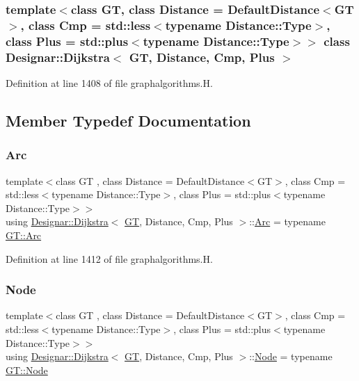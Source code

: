 \subsubsection*{template$<$class GT, class Distance = Default\+Distance$<$\+G\+T$>$, class Cmp = std\+::less$<$typename Distance\+::\+Type$>$, class Plus = std\+::plus$<$typename Distance\+::\+Type$>$$>$\newline
class Designar\+::\+Dijkstra$<$ G\+T, Distance, Cmp, Plus $>$}



Definition at line 1408 of file graphalgorithms.\+H.



\subsection{Member Typedef Documentation}
\mbox{\label{class_designar_1_1_dijkstra_a5f0682f4edfd1456b7d4432fa976c641}} 
\subsubsection{\texorpdfstring{Arc}{Arc}}
{\footnotesize\ttfamily template$<$class GT , class Distance  = Default\+Distance$<$\+G\+T$>$, class Cmp  = std\+::less$<$typename Distance\+::\+Type$>$, class Plus  = std\+::plus$<$typename Distance\+::\+Type$>$$>$ \\
using \hyperlink{class_designar_1_1_dijkstra}{Designar\+::\+Dijkstra}$<$ \hyperlink{demo-buildgraph_8_c_a3001c40d2c31ca87ed96cd7d1334a55e}{GT}, Distance, Cmp, Plus $>$\+::\hyperlink{class_designar_1_1_dijkstra_a5f0682f4edfd1456b7d4432fa976c641}{Arc} =  typename \hyperlink{class_designar_1_1_graph_a74c730ef4ce2d20f998d72bd25c2b5bf}{G\+T\+::\+Arc}}



Definition at line 1412 of file graphalgorithms.\+H.

\mbox{\label{class_designar_1_1_dijkstra_afeb644fc5395569ec366f0d220ab477d}} 
\subsubsection{\texorpdfstring{Node}{Node}}
{\footnotesize\ttfamily template$<$class GT , class Distance  = Default\+Distance$<$\+G\+T$>$, class Cmp  = std\+::less$<$typename Distance\+::\+Type$>$, class Plus  = std\+::plus$<$typename Distance\+::\+Type$>$$>$ \\
using \hyperlink{class_designar_1_1_dijkstra}{Designar\+::\+Dijkstra}$<$ \hyperlink{demo-buildgraph_8_c_a3001c40d2c31ca87ed96cd7d1334a55e}{GT}, Distance, Cmp, Plus $>$\+::\hyperlink{class_designar_1_1_dijkstra_afeb644fc5395569ec366f0d220ab477d}{Node} =  typename \hyperlink{class_designar_1_1_graph_a5dfc7dba9d092ac489c72e40390c37d0}{G\+T\+::\+Node}}



